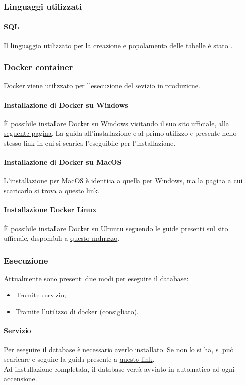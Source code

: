 \subsubsection{Linguaggi utilizzati}
\paragraph{SQL}
Il linguaggio utilizzato per la creazione e popolamento delle tabelle è stato .

\subsubsection{Docker container}
Docker viene utilizzato per l'esecuzione del sevizio in produzione.
\paragraph{Installazione di Docker su Windows}
È possibile installare Docker su Windows visitando il suo sito ufficiale, alla \href{https://hub.docker.com/editions/community/docker-ce-desktop-windows}{seguente pagina}. La guida all'installazione e al primo utilizzo è presente nello stesso link in cui si scarica l'eseguibile per l'installazione.
\paragraph{Installazione di Docker su MacOS}
L'installazione per MacOS è identica a quella per Windows, ma la pagina a cui scaricarlo si trova a \href{https://hub.docker.com/editions/community/docker-ce-desktop-mac}{questo link}.
\paragraph{Installazione Docker Linux}
È possibile installare Docker su Ubuntu seguendo le guide presenti sul sito ufficiale, disponibili a \href{https://docs.docker.com/engine/install/ubuntu/}{questo indirizzo}.

\subsubsection{Esecuzione}
Attualmente sono presenti due modi per eseguire il database:
\begin{itemize}
	\item Tramite servizio;
	\item Tramite l'utilizzo di docker (consigliato).
\end{itemize}
\paragraph{Servizio}
Per eseguire il database è necessario averlo installato. Se non lo si ha, si può scaricare e seguire la guida presente a \href{https://mariadb.org/download/}{questo link}. \\
Ad installazione completata, il database verrà avviato in automatico ad ogni accensione.
